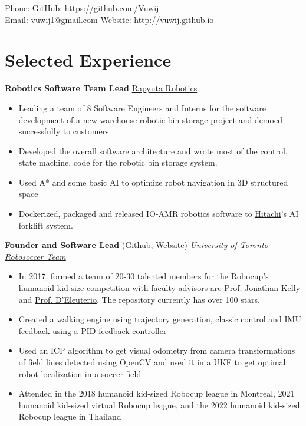 \documentclass[11pt, a4paper]{cv}
\renewcommand*{\name}{\fontsize{24}{40}\mdseries\upshape}
\begin{document}
\begin{center}
\name{Jason Wang}
\end{center}


Phone: \texttt{} \hfill
GitHub: \href{https://github.com/Vuwij}{https://github.com/Vuwij}\\
Email: \href{mailto:vuwij1@gmail.com}{vuwij1@gmail.com}\hfill
Website: \href{http://vuwij.github.io}{http://vuwij.github.io}


\section*{Selected Experience}\noindent
	\textbf{Robotics Software Team Lead} \hfill 	\href{https://www.rapyuta-robotics.com}{Rapyuta Robotics}
	\begin{itemize}
	\item Leading a team of 8 Software Engineers and Interns for the software development of a new warehouse robotic bin storage project and demoed successfully to customers
	\item Developed the overall software architecture and wrote most of the control, state machine, code for the robotic bin storage system.
	\item Used A* and some basic AI to optimize robot navigation in 3D structured space
	\item Dockerized, packaged and released IO-AMR robotics software to \href{https://www.hitachi.com/}{Hitachi}'s AI forklift system.
	\end{itemize}

	\textbf{Founder and Software Lead} (\href{https://github.com/utra-robosoccer/soccerbot} {Github}, \href{https://utra-robosoccer.github.io/}{Website}) \hfill \emph{\href{https://utra-robosoccer.github.io/}{University of Toronto Robosoccer Team}}
	\begin{itemize}
		\item In 2017, formed a team of 20-30 talented members for the \href{https://www.robocup.org/}{Robocup}'s humanoid kid-size competition with faculty advisors are \href{http://stars.utias.utoronto.ca/~jkelly/}{Prof. Jonathan Kelly} and \href{http://www.utias.utoronto.ca/research/space-robotics/}{Prof. D’Eleuterio}. The repository currently has over 100 stars.
		\item Created a walking engine using trajectory generation, classic control and IMU feedback using a PID feedback controller
		\item Used an ICP algorithm to get visual odometry from camera transformations of field lines detected using OpenCV and used it in a UKF to get optimal robot localization in a soccer field
		\item Attended in the 2018 humanoid kid-sized Robocup league in Montreal, 2021 humanoid kid-sized virtual Robocup league, and the 2022 humanoid kid-sized Robocup league in Thailand
	\end{itemize}
\end{document}
